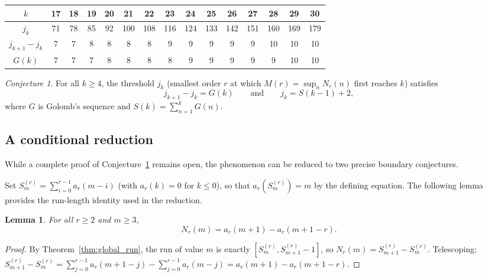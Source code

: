 \documentclass[12pt]{article}
\newtheorem{lemma}[theorem]{Lemma}
\theoremstyle{definition}
\theoremstyle{remark}
\newtheorem{conjecture}[theorem]{Conjecture}
\begin{document}
\begin{table}[ht]
{\smallskip
\begin{tabular}{c|cccccccccccccc}
$k$             & 17 & 18 & 19 & 20 & 21 & 22 & 23 & 24 & 25 & 26 & 27 & 28 & 29 & 30 \\\hline
$j_k$           & 71 & 78 & 85 & 92 &100 &108 &116 &124 &133 &142 &151 &160 &169 &179 \\\hline
$j_{k+1}{-}j_k$ &  7 &  7 &  8 &  8 &  8 &  8 &  9 &  9 &  9 &  9 &  9 & 10 & 10 & 10 \\\hline
$G(k)$          &  7 &  7 &  7 &  8 &  8 &  8 &  8 &  9 &  9 &  9 &  9 &  9 & 10 & 10 \\
\end{tabular}
}
\end{table}

\begin{conjecture}\label{conj:golomb_return}
  For all $k\ge 4$, the threshold $j_k$ (smallest order $r$ at which
  $M(r)=\sup_n N_r(n)$ first reaches $k$) satisfies
  \[
    j_{k+1}-j_k = G(k) \qquad \text{and} \qquad j_k = S(k-1)+2,
  \]
  where $G$ is Golomb's sequence and $S(k)=\sum_{n=1}^{k}G(n)$.
\end{conjecture}

\subsection{A conditional reduction}

While a complete proof of Conjecture~\ref{conj:golomb_return} remains open,
the phenomenon can be reduced to two precise boundary conjectures.

Set $S_m^{(r)} = \sum_{i=0}^{r-1} a_r(m-i)$ (with $a_r(k)=0$ for $k\le 0$),
so that $a_r(S_m^{(r)})=m$ by the defining equation.
The following lemma provides the run-length identity used in the reduction.

\begin{lemma}\label{lem:run_identity}
  For all $r\ge 2$ and $m\ge 3$,
  \begin{equation}\label{eq:run_diff}
    N_r(m) = a_r(m+1) - a_r(m+1-r).
  \end{equation}
\end{lemma}

\begin{proof}
  By Theorem~\ref{thm:global_run}, the run of value $m$ is exactly
  $[S_m^{(r)},S_{m+1}^{(r)}-1]$, so $N_r(m)=S_{m+1}^{(r)}-S_m^{(r)}$.
  Telescoping: $S_{m+1}^{(r)}-S_m^{(r)}=\sum_{j=0}^{r-1}a_r(m+1-j)-\sum_{j=0}^{r-1}a_r(m-j)
  =a_r(m+1)-a_r(m+1-r)$.
\end{proof}
\end{document}
